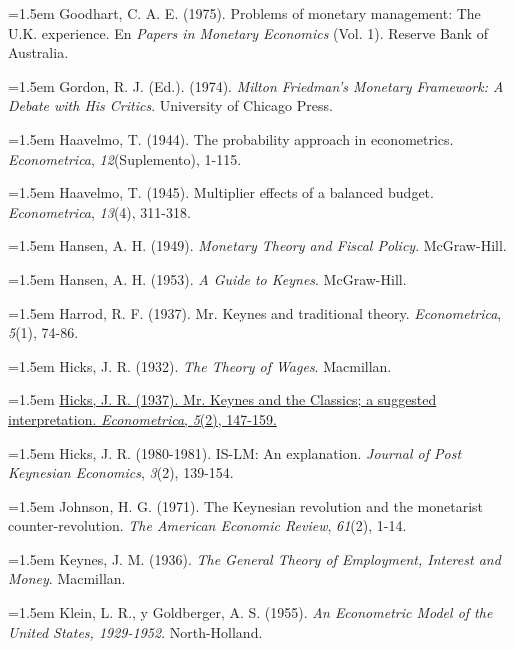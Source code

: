 \documentclass[10pt,a4paper]{article}
\begin{document}
\noindent\hangindent=1.5em Goodhart, C. A. E. (1975). Problems of monetary management: The U.K. experience. En \textit{Papers in Monetary Economics} (Vol. 1). Reserve Bank of Australia.

\noindent\hangindent=1.5em Gordon, R. J. (Ed.). (1974). \textit{Milton Friedman's Monetary Framework: A Debate with His Critics}. University of Chicago Press.

\noindent\hangindent=1.5em Haavelmo, T. (1944). The probability approach in econometrics. \textit{Econometrica}, \textit{12}(Suplemento), 1-115.

\noindent\hangindent=1.5em Haavelmo, T. (1945). Multiplier effects of a balanced budget. \textit{Econometrica}, \textit{13}(4), 311-318.

\noindent\hangindent=1.5em Hansen, A. H. (1949). \textit{Monetary Theory and Fiscal Policy}. McGraw-Hill.

\noindent\hangindent=1.5em Hansen, A. H. (1953). \textit{A Guide to Keynes}. McGraw-Hill.

\noindent\hangindent=1.5em Harrod, R. F. (1937). Mr. Keynes and traditional theory. \textit{Econometrica}, \textit{5}(1), 74-86.

\noindent\hangindent=1.5em Hicks, J. R. (1932). \textit{The Theory of Wages}. Macmillan.

\noindent\hangindent=1.5em \href{https://public.econ.duke.edu/~kdh9/Courses/Graduate%20Macro%20History/Readings-1/Hicks_Mr.%20Keynes%20and%20the%20Classics.pdf}{Hicks, J. R. (1937). Mr. Keynes and the Classics; a suggested interpretation. \textit{Econometrica}, \textit{5}(2), 147-159.}

\noindent\hangindent=1.5em Hicks, J. R. (1980-1981). IS-LM: An explanation. \textit{Journal of Post Keynesian Economics}, \textit{3}(2), 139-154.

\noindent\hangindent=1.5em Johnson, H. G. (1971). The Keynesian revolution and the monetarist counter-revolution. \textit{The American Economic Review}, \textit{61}(2), 1-14.

\noindent\hangindent=1.5em Keynes, J. M. (1936). \textit{The General Theory of Employment, Interest and Money}. Macmillan.

\noindent\hangindent=1.5em Klein, L. R., y Goldberger, A. S. (1955). \textit{An Econometric Model of the United States, 1929-1952}. North-Holland.
\end{document}
